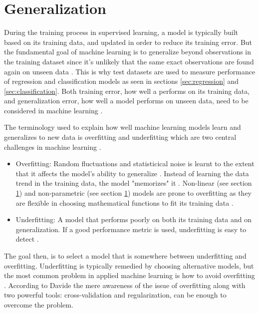 \section{Generalization}
	During the training process in supervised learning, a model is typically built based on its training data, and updated in order to reduce its training error. But the fundamental goal of machine learning is to generalize beyond observations in the training dataset since it's unlikely that the same exact observations are found again on unseen data \cite{ARTICLE:3}. This is why test datasets are used to measure performance of regression and classification models as seen in sections \ref{sec:regression} and \ref{sec:classification}. Both training error, how well a performs on its training data, and generalization error, how well a model performs on unseen data, need to be considered in machine learning \cite{BOOK:1}.

	The terminology used to explain how well machine learning models learn and generalizes to new data is overfitting and underfitting \cite{WEBSITE:8} which are two central challenges in machine learning \cite{BOOK:1}. 
\begin{itemize}
	\item{Overfitting:} Random fluctuations and statisticical noise is learnt to the extent that it affects the model's ability to generalize \cite{WEBSITE:8}. Instead of learning the data trend in the training data, the model "memorizes" it \cite{ARTICLE:4}. Non-linear (see section \ref{}) and non-parametric (see section \ref{}) models are prone to overfitting as they are flexible in choosing mathematical functions to fit its training data \cite{WEBSITE:8}.  
	\item{Underfitting:} A model that performs poorly on both its training data and on generalization. If a good performance metric is used, underfitting is  easy to detect \cite{WEBSITE:8}.
\end{itemize}
The goal then, is to select a model that is somewhere between underfitting and overfitting. Underfitting is typically remedied by choosing alternative models, but the most common problem in applied machine learning is how to avoid overfitting \cite{WEBSITE:8}. According to Davide \cite{ARTICLE:4}  the mere awareness of the issue of overfitting along with two powerful tools: cross-validation and regularization, can be enough to overcome the problem.

